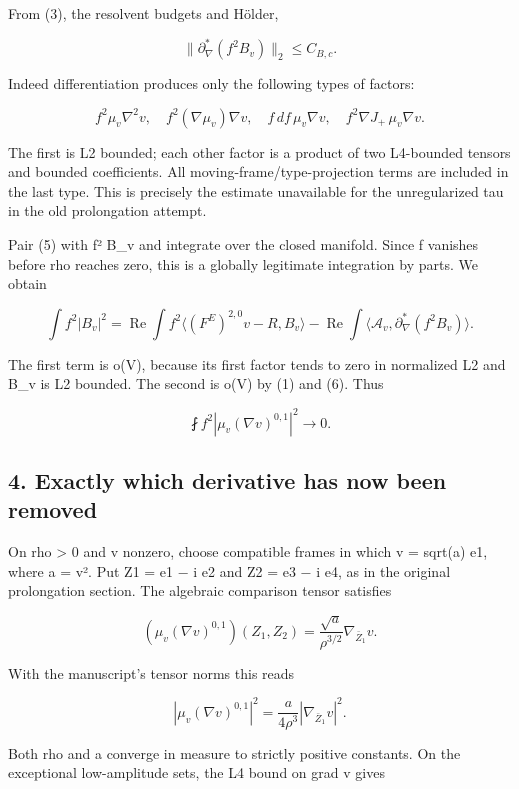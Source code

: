 From (3), the resolvent budgets and Hölder,

\[
 \|\partial_\nabla^*(f^2B_v)\|_2\le C_{B,c}.
\tag{6}
\]

Indeed differentiation produces only the following types of factors:

\[
 f^2\mu_v\nabla^2v,\quad
 f^2(\nabla\mu_v)\nabla v,\quad
 f\,df\,\mu_v\nabla v,\quad
 f^2\nabla J_+\,\mu_v\nabla v.
\]

The first is L2 bounded; each other factor is a product of two
L4-bounded tensors and bounded coefficients. All
moving-frame/type-projection terms are included in the last type. This
is precisely the estimate unavailable for the unregularized tau in the
old prolongation attempt.

Pair (5) with f² B\_v and integrate over the closed manifold. Since f
vanishes before rho reaches zero, this is a globally legitimate
integration by parts. We obtain

\[
 \int f^2|B_v|^2
 =\operatorname{Re}\int f^2\langle(F^E)^{2,0}v-R,B_v\rangle
 -\operatorname{Re}\int
 \langle\mathcal A_v,\partial_\nabla^*(f^2B_v)\rangle.
\tag{7}
\]

The first term is o(V), because its first factor tends to zero in
normalized L2 and B\_v is L2 bounded. The second is o(V) by (1) and (6).
Thus

\[
 \boxed{\fint f^2|\mu_v(\nabla v)^{0,1}|^2\longrightarrow0.}
\tag{8}
\]

\hypertarget{o10prolong:exactly-which-derivative-has-now-been-removed}{%
\subsection{4. Exactly which derivative has now been
removed}\label{o10prolong:exactly-which-derivative-has-now-been-removed}}

On rho \textgreater{} 0 and v nonzero, choose compatible frames in which
v = sqrt(a) e1, where a = \textbar v\textbar². Put Z1 = e1 − i e2 and Z2
= e3 − i e4, as in the original prolongation section. The algebraic
comparison tensor satisfies

\[
 (\mu_v(\nabla v)^{0,1})(Z_1,Z_2)
 =\frac{\sqrt a}{\rho^{3/2}}\nabla_{\bar Z_1}v.
\]

With the manuscript's tensor norms this reads

\[
 |\mu_v(\nabla v)^{0,1}|^2
 =\frac{a}{4\rho^3}|\nabla_{\bar Z_1}v|^2.
\tag{9}
\]

Both rho and a converge in measure to strictly positive constants. On
the exceptional low-amplitude sets, the L4 bound on grad v gives

